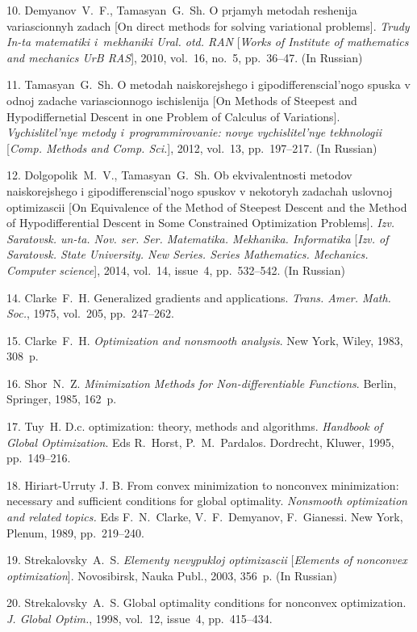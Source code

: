{10.    Demyanov~V.~F., Tamasyan~G.~Sh.  O prjamyh metodah
reshenija variascionnyh zadach [On direct methods for solving
variational problems]. \textit{Trudy In-ta matematiki i~mekhaniki
Ural. otd. RAN} [\textit{Works of Institute of mathe\-mat\-ics and
mechanics UrB RAS}],      2010, vol.~16, no.~5, pp.~36--47. (In
Russian)

11. Tamasyan~G.~Sh. O metodah naiskorejshego i
gipodifferenscial'nogo spuska v odnoj zadache variascionnogo
ischislenija [On Methods of Steepest and Hypodiffernetial Descent
in one Problem of Calculus of Variations]. \textit{Vychislitel'nye
metody i~programmirovanie: novye vychislitel'nye tekhnologii}
[\textit{Comp. Methods and Comp. Sci.}], 2012, vol.~13,
pp.~197--217. (In Russian)

12. Dolgopolik~M.~V., Tamasyan~G.~Sh. Ob ekvivalentnosti metodov
naiskorejshego i gipodifferenscial'nogo spuskov v nekotoryh
zadachah uslovnoj optimizascii   [On Equivalence of the Method of
Steepest Descent and the Method of Hypodifferential Descent in
Some Constrained Optimization Problems]. \textit{Izv. Saratovsk.
un-ta. Nov. ser. Ser. Matematika. Mekhanika. Informatika}
[\textit{Izv. of Saratovsk. State University. New Series. Series
Mathematics. Mechanics. Computer science}], 2014, vol.~14,
issue~4, pp.~532--542. (In Russian)

14. Clarke~F.~H. Generalized gradients and applications.
\textit{Trans. Amer. Math. Soc.}, 1975, vol.~205, pp.~247--262.

15. Clarke~F.~H. \textit{Optimization and nonsmooth analysis}. New
York, Wiley, 1983, 308~p.

16. Shor~N.~Z. \textit{Minimization Methods for Non-differentiable
Functions}. Berlin, Springer, 1985, 162~p.

17. Tuy~H. D.c. optimization: theory, methods and algorithms.
\textit{Handbook of Global Optimization}. Eds R.~Horst,
P.~M.~Pardalos. Dordrecht, Kluwer, 1995, pp.~149--216.

18. Hiriart-Urruty J. B. From convex minimization to nonconvex
minimization: nec\-es\-sary and sufficient conditions for global
optimality. \textit{Nonsmooth optimization and related topics.}
Eds F.~N.~Clarke, V.~F.~Demyanov, F.~Gianessi. New York, Plenum,
1989, pp.~219--240.

19. Strekalovsky~A.~S. \textit{Elementy nevypukloj optimizascii}
[\textit{Elements of nonconvex opti\-mi\-zation}]. Novosibirsk,
Nauka Publ., 2003, 356~p. (In Russian)

20. Strekalovsky~A.~S. Global optimality conditions for nonconvex
optimization. \textit{J. Global Optim.}, 1998, vol.~12, issue~4,
pp.~415--434.

}
